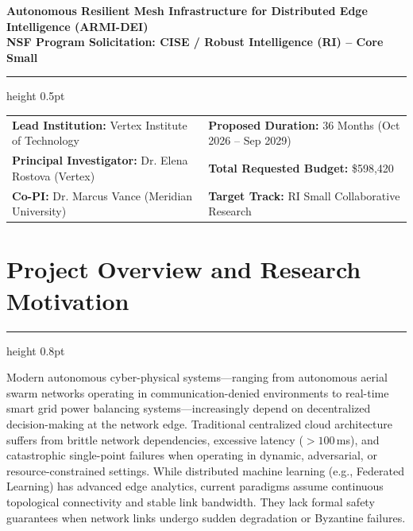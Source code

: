\documentclass[11pt,letterpaper]{scrartcl}
\newcommand{\sectionline}{%
  \vspace{-0.5em}%
  {\color{NSFNavy}\hrule height 0.8pt}%
  \vspace{0.2em}%
}
\begin{document}
\begin{tcolorbox}[headerbox]
\begin{center}
{\sffamily\Huge\bfseries Autonomous Resilient Mesh Infrastructure for Distributed Edge Intelligence (ARMI-DEI)} \\[0.4em]
{\sffamily\large\bfseries NSF Program Solicitation: CISE / Robust Intelligence (RI) -- Core Small}
\end{center}
\vspace{0.2em}
{\color{white!40}\hrule height 0.5pt}
\vspace{0.3em}
\begin{tabularx}{\textwidth}{@{}X X@{}}
\textbf{Lead Institution:} Vertex Institute of Technology & \textbf{Proposed Duration:} 36 Months (Oct 2026 -- Sep 2029) \\
\textbf{Principal Investigator:} Dr. Elena Rostova (Vertex) & \textbf{Total Requested Budget:} \$598,420 \\
\textbf{Co-PI:} Dr. Marcus Vance (Meridian University) & \textbf{Target Track:} RI Small Collaborative Research
\end{tabularx}
\end{tcolorbox}

\vspace{0.1em}

\section{Project Overview and Research Motivation}
\sectionline

Modern autonomous cyber-physical systems---ranging from autonomous aerial swarm networks operating in communication-denied environments to real-time smart grid power balancing systems---increasingly depend on decentralized decision-making at the network edge. Traditional centralized cloud architecture suffers from brittle network dependencies, excessive latency ($>100$\,ms), and catastrophic single-point failures when operating in dynamic, adversarial, or resource-constrained settings. While distributed machine learning (e.g., Federated Learning) has advanced edge analytics, current paradigms assume continuous topological connectivity and stable link bandwidth. They lack formal safety guarantees when network links undergo sudden degradation or Byzantine failures.
\end{document}
